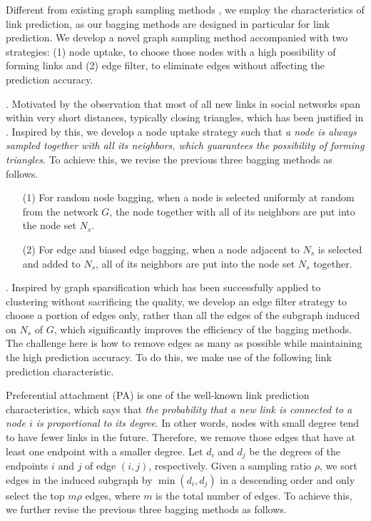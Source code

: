 Different from existing graph sampling methods \cite{ahmed2014tkdd, leskovec2006},
we employ the characteristics of link prediction, as our bagging methods are designed in particular for link prediction.
We develop a novel graph sampling method accompanied with two strategies:
(1) node uptake, to choose those nodes with a high possibility of forming links  and (2) edge filter, to eliminate edges without affecting the prediction accuracy.


. Motivated by the observation that most of all new links in social networks span within very short distances, typically closing triangles, which has been justified in \cite{leskovec-2008}.  Inspired by this, we develop a node uptake strategy such that {\em a node is always sampled together
with all its neighbors, which guarantees the possibility of forming triangles}. To achieve this, we revise the previous three bagging methods as follows.

\begin{enumerate}
\item[(1)]
For random node bagging, when a node is selected uniformly at random from the network $G$, the node together with all of
its neighbors are put into the node set $N_s$.
\item[(2)]
For edge and biased edge bagging, when a node adjacent to $N_s$ is
 selected and added to $N_s$, all of its neighbors are put into the node set $N_s$ together.
\end{enumerate}


. Inspired by graph sparsification \cite{chen2015, satuluri2011}
which has been successfully applied to clustering without sacrificing the quality,
we develop an edge filter strategy to choose a portion of edges only, rather than all the edges of the subgraph induced on $N_s$ of $G$,
which significantly improves the efficiency of the bagging methods.
The challenge here is how to remove edges as many as possible while maintaining the high prediction accuracy.
To do this, we make use of the following link prediction characteristic.


Preferential attachment (PA) \cite{albert1999,leskovec-2008} is one of the well-known
link prediction characteristics, which says that {\em the probability
that a new link is connected to a node $i$ is proportional to its degree}.
In other words, nodes with small degree tend to have fewer links in the future.
Therefore, we remove those edges that have at least one endpoint  with a smaller degree.
Let $d_i$ and $d_j$ be the degrees of the endpoints $i$  and $j$ of edge $(i, j)$, respectively. Given a sampling ratio $\rho$,
we sort edges in the induced subgraph by $\min(d_i, d_j)$ in a
descending order and only select the top $m\rho$ edges, where $m$ is the total number of edges.
%
To achieve this, we further revise the previous three bagging methods as follows.

